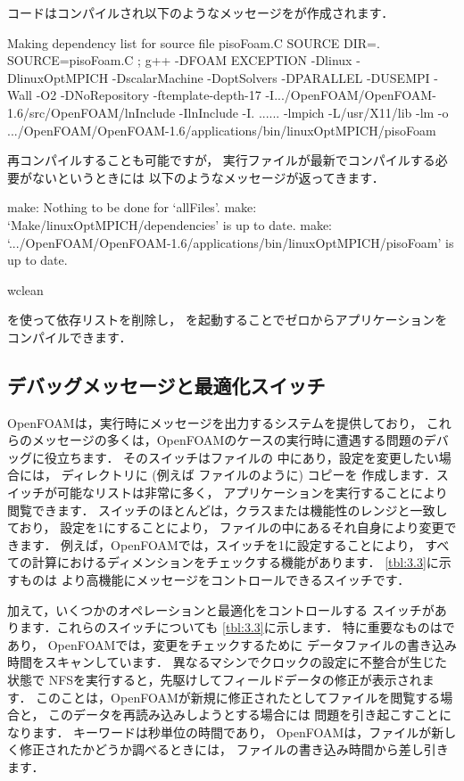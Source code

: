 コードはコンパイルされ以下のようなメッセージをが作成されます．
\begin{OFverbatim}[file]
Making dependency list for source file pisoFoam.C
SOURCE DIR=.
SOURCE=pisoFoam.C ;
g++ -DFOAM EXCEPTION -Dlinux -DlinuxOptMPICH
-DscalarMachine -DoptSolvers -DPARALLEL -DUSEMPI -Wall -O2 -DNoRepository
-ftemplate-depth-17 -I.../OpenFOAM/OpenFOAM-1.6/src/OpenFOAM/lnInclude
-IlnInclude
-I.
......
-lmpich -L/usr/X11/lib -lm
-o .../OpenFOAM/OpenFOAM-1.6/applications/bin/linuxOptMPICH/pisoFoam
\end{OFverbatim}
再コンパイルすることも可能ですが，
実行ファイルが最新でコンパイルする必要がないというときには
以下のようなメッセージが返ってきます．
\begin{OFverbatim}[file]
make: Nothing to be done for `allFiles'.
make: `Make/linuxOptMPICH/dependencies' is up to date.
make: `.../OpenFOAM/OpenFOAM-1.6/applications/bin/linuxOptMPICH/pisoFoam'
is up to date.
\end{OFverbatim}

\begin{OFverbatim}[terminal]
wclean
\end{OFverbatim}
を使って依存リストを削除し，
を起動することでゼロからアプリケーションをコンパイルできます．


\subsection{デバッグメッセージと最適化スイッチ}
\label{ssec:3.2.5}
OpenFOAMは，実行時にメッセージを出力するシステムを提供しており，
これらのメッセージの多くは，OpenFOAMのケースの実行時に遭遇する問題のデバッグに役立ちます．
そのスイッチはファイルの
中にあり，設定を変更したい場合には，
ディレクトリに (例えば
ファイルのように) コピーを
作成します．スイッチが可能なリストは非常に多く，
アプリケーションを実行することにより閲覧できます．
スイッチのほとんどは，クラスまたは機能性のレンジと一致しており，
設定を1にすることにより，
ファイルの中にあるそれ自身により変更できます．
例えば，OpenFOAMでは，スイッチを1に設定することにより，
すべての計算におけるディメンションをチェックする機能があります．
\autoref{tbl:3.3}に示すものは
より高機能にメッセージをコントロールできるスイッチです．

加えて，いくつかのオペレーションと最適化をコントロールする
スイッチがあります．これらのスイッチについても
\autoref{tbl:3.3}に示します．
特に重要なものはであり，
OpenFOAMでは，変更をチェックするために
データファイルの書き込み時間をスキャンしています．
異なるマシンでクロックの設定に不整合が生じた状態で
NFSを実行すると，先駆けしてフィールドデータの修正が表示されます．
このことは，OpenFOAMが新規に修正されたとしてファイルを閲覧する場合と，
このデータを再読み込みしようとする場合には
問題を引き起こすことになります．
キーワードは秒単位の時間であり，
OpenFOAMは，ファイルが新しく修正されたかどうか調べるときには，
ファイルの書き込み時間から差し引きます．


